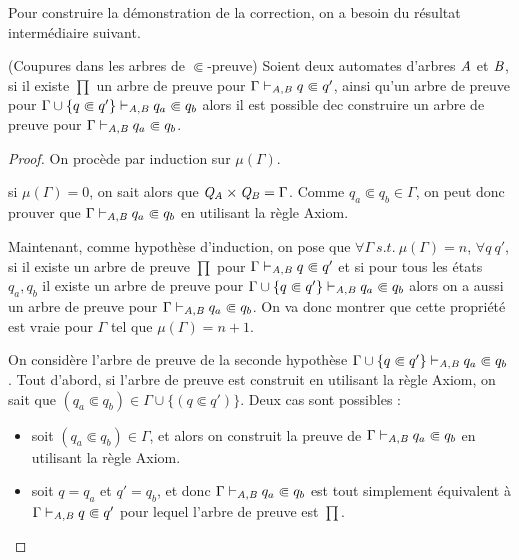 Pour construire la démonstration de la correction, on a besoin du résultat intermédiaire suivant.

\begin{lemma}{(Coupures dans les arbres de $\Subset$-preuve)}
  \label{lem:cut}
  Soient deux automates d'arbres $\mathit A$ et $\mathit B$, si il existe $\prod$ un arbre de preuve
  pour $\Gamma \vdash_{\mathit A, \mathit B} q \Subset q'$, ainsi qu'un arbre de preuve pour
  $\Gamma \cup \{q \Subset q'\}\vdash_{\mathit A, \mathit B} q_a \Subset q_b$
  alors il est possible dec construire un arbre de preuve pour $\Gamma \vdash_{\mathit A, \mathit B} q_a \Subset q_b$.
\end{lemma}

\begin{proof}
  On procède par induction sur $\mu(\Gamma)$.
  
  \noindent
  si $\mu(\Gamma) = 0$, on sait alors que $\mathit Q_\mathit A \times \mathit Q_\mathit B = \Gamma$.
  Comme $q_a \Subset q_b \in \Gamma$, on peut donc prouver que 
  $\Gamma \vdash_{\mathit A,\mathit B} q_a \Subset q_b$ en utilisant la règle Axiom.
  
  \medskip
  \noindent
  Maintenant, comme hypothèse d'induction, on pose que $\forall \Gamma\  s.t.\ \mu(\Gamma) = n$, $\forall q\ q'$,
  si il existe un arbre de preuve $\prod$ pour $\Gamma \vdash_{\mathit A, \mathit B} q \Subset q'$ et si pour tous les états $q_a, q_b$
  il existe un arbre de preuve pour $\Gamma \cup \{q \Subset q'\}\vdash_{\mathit A, \mathit B} q_a \Subset q_b$ alors on a aussi
  un arbre de preuve pour $\Gamma \vdash_{\mathit A, \mathit B} q_a \Subset q_b$. On va donc montrer que cette propriété est vraie
  pour $\Gamma$ tel que $\mu(\Gamma) = n+1$.
  
  \medskip
  \noindent
  On considère l'arbre de preuve de la seconde hypothèse $\Gamma \cup \{q \Subset
  q'\}\vdash_{\mathit A, \mathit B} q_a \Subset q_b$.  Tout d'abord, si l'arbre de preuve est construit 
  en utilisant la règle Axiom, on sait que $(q_a \Subset q_b) \in \Gamma \cup \{(q \Subset
  q')\}$.  Deux cas sont possibles :
  \begin{itemize}
  \item soit $(q_a \Subset q_b) \in \Gamma$, et alors on construit la preuve de 
    $\Gamma \vdash_{\mathit A,\mathit B} q_a \Subset q_b$ en utilisant la règle Axiom.
    
  \item soit $q = q_a$ et $q' = q_b$, et donc $\Gamma \vdash_{\mathit A,\mathit B} q_a
    \Subset q_b$ est tout simplement équivalent à $\Gamma \vdash_{\mathit A, \mathit B} q \Subset q'$ pour lequel
    l'arbre de preuve est $\prod$.
  \end{itemize}
  

\end{proof}
